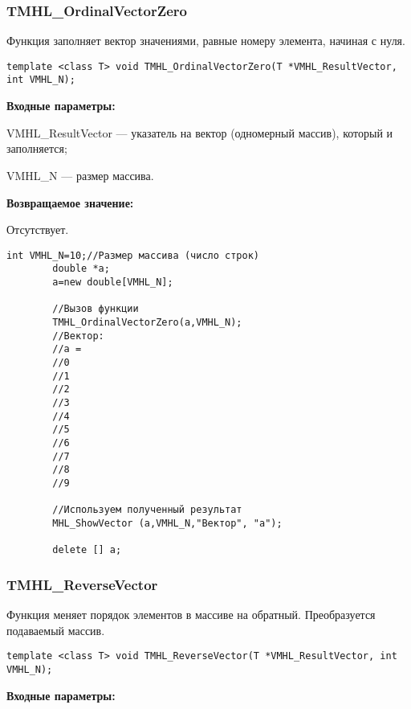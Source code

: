 \documentclass[a4paper,12pt]{article}
\begin{document}
\subsubsection{TMHL\_OrdinalVectorZero}\label{TMHL_OrdinalVectorZero}

Функция заполняет вектор значениями, равные номеру элемента, начиная с нуля.


\begin{lstlisting}[label=code_syntax_TMHL_OrdinalVectorZero,caption=Синтаксис]
template <class T> void TMHL_OrdinalVectorZero(T *VMHL_ResultVector, int VMHL_N);
\end{lstlisting}

\textbf{Входные параметры:}

 VMHL\_ResultVector --- указатель на вектор (одномерный массив), который и заполняется;
 
 VMHL\_N --- размер массива.

\textbf{Возвращаемое значение:}

Отсутствует.


\begin{lstlisting}[label=code_use_TMHL_OrdinalVectorZero,caption=Пример использования]
        int VMHL_N=10;//Размер массива (число строк)
        double *a;
        a=new double[VMHL_N];

        //Вызов функции
        TMHL_OrdinalVectorZero(a,VMHL_N);
        //Вектор:
        //a =
        //0
        //1
        //2
        //3
        //4
        //5
        //6
        //7
        //8
        //9

        //Используем полученный результат
        MHL_ShowVector (a,VMHL_N,"Вектор", "a");

        delete [] a;
\end{lstlisting}

\subsubsection{TMHL\_ReverseVector}\label{TMHL_ReverseVector}

Функция меняет порядок элементов в массиве на обратный. Преобразуется подаваемый массив.


\begin{lstlisting}[label=code_syntax_TMHL_ReverseVector,caption=Синтаксис]
template <class T> void TMHL_ReverseVector(T *VMHL_ResultVector, int VMHL_N);
\end{lstlisting}

\textbf{Входные параметры:}  
 
\end{document}
